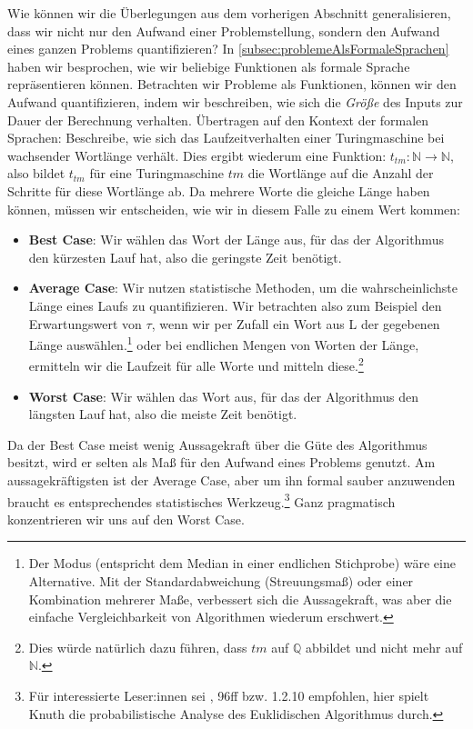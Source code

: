 Wie können wir die Überlegungen aus dem vorherigen Abschnitt generalisieren,
dass wir nicht nur den Aufwand einer Problemstellung,
sondern den Aufwand eines ganzen Problems quantifizieren?
In \autoref{subsec:problemeAlsFormaleSprachen} haben wir besprochen,
wie wir beliebige Funktionen als formale Sprache repräsentieren können.
Betrachten wir Probleme als Funktionen,
können wir den Aufwand quantifizieren,
indem wir beschreiben,
wie sich die \emph{Größe} des Inputs zur Dauer der Berechnung verhalten.
Übertragen auf den Kontext der formalen Sprachen:
Beschreibe, wie sich das Laufzeitverhalten einer Turingmaschine 
bei wachsender Wortlänge verhält.
Dies ergibt wiederum eine Funktion:
$t_{tm}: \mathbb{N} \rightarrow \mathbb{N}$,
also bildet $t_{tm}$ für eine Turingmaschine $tm$ die Wortlänge auf
die Anzahl der Schritte für diese Wortlänge ab.
Da mehrere Worte die gleiche Länge haben können,
müssen wir entscheiden, wie wir in diesem Falle zu einem Wert kommen:
\begin{itemize}
    \item \textbf{Best Case}: Wir wählen das Wort der Länge aus,
        für das der Algorithmus den kürzesten Lauf hat,
        also die geringste Zeit benötigt.
    \item \textbf{Average Case}: Wir nutzen statistische Methoden,
        um die wahrscheinlichste Länge eines Laufs zu quantifizieren.
        Wir betrachten also zum Beispiel den Erwartungswert von $\tau$,
        wenn wir per Zufall ein Wort aus L der gegebenen Länge auswählen.\footnote{
            Der Modus (entspricht dem Median in einer endlichen Stichprobe) wäre eine Alternative.
        Mit der Standardabweichung (Streuungsmaß) oder einer Kombination mehrerer Maße,
        verbessert sich die Aussagekraft,
        was aber die einfache Vergleichbarkeit von Algorithmen wiederum erschwert.}
        oder bei endlichen Mengen von Worten der Länge,
        ermitteln wir die Laufzeit für alle Worte und mitteln diese.\footnote{Dies würde natürlich dazu führen, dass $tm$ auf $\mathbb{Q}$ abbildet und nicht mehr auf $\mathbb{N}$.}
    \item \textbf{Worst Case}: Wir wählen das Wort aus,
        für das der Algorithmus den längsten Lauf hat,
        also die meiste Zeit benötigt.
\end{itemize} 

Da der Best Case meist wenig Aussagekraft über die Güte des Algorithmus besitzt,
wird er selten als Maß für den Aufwand eines Problems genutzt.
Am aussagekräftigsten ist der Average Case,
aber um ihn formal sauber anzuwenden braucht es
entsprechendes statistisches Werkzeug.\footnote{
    Für interessierte Leser:innen sei \cite{knuth1}, 96ff bzw. 1.2.10 empfohlen,
    hier spielt Knuth die probabilistische Analyse des Euklidischen Algorithmus durch.} 
Ganz pragmatisch konzentrieren wir uns auf den Worst Case.


